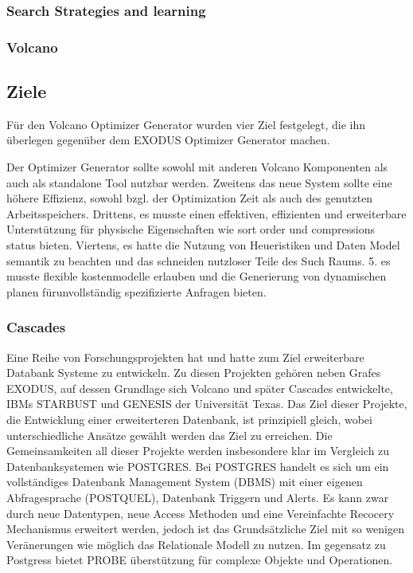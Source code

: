 \subsubsection{Search Strategies and learning}

\subsubsection{Volcano}

\subsection{Ziele}
Für den Volcano Optimizer Generator wurden vier Ziel festgelegt, die ihn überlegen gegenüber dem EXODUS Optimizer Generator machen.

Der Optimizer Generator sollte sowohl mit anderen Volcano Komponenten als auch als standalone Tool nutzbar werden. Zweitens das neue System sollte eine höhere Effizienz, sowohl bzgl. der Optimization Zeit als auch des genutzten Arbeitsspeichers. Drittens, es musste einen effektiven, effizienten und erweiterbare Unterstützung für physische Eigenschaften wie sort order und compressions status bieten. Viertens, es hatte die Nutzung von Heueristiken und Daten Model semantik zu beachten und das schneiden nutzloser Teile des Such Raums. 5. es musste flexible kostenmodelle erlauben und die Generierung von dynamischen planen fürunvollständig spezifizierte Anfragen bieten.



\subsubsection{Cascades}








Eine Reihe von Forschungsprojekten hat und hatte zum Ziel erweiterbare Databank Systeme zu entwickeln. Zu diesen Projekten gehören neben Grafes EXODUS, auf dessen Grundlage sich Volcano und später Cascades entwickelte, IBMs STARBUST und GENESIS der Universität Texas. Das Ziel dieser Projekte, die Entwicklung einer erweiterteren Datenbank, ist prinzipiell gleich, wobei unterschiedliche Ansätze gewählt werden das Ziel zu erreichen. Die Gemeinsamkeiten all dieser Projekte werden insbesondere klar im Vergleich zu Datenbanksystemen wie POSTGRES. Bei POSTGRES handelt es sich um ein vollständiges Datenbank Management System (\ac{DBMS}) mit einer eigenen Abfragesprache (POSTQUEL), Datenbank Triggern und Alerts. Es kann zwar durch neue Datentypen, neue Access Methoden und eine Vereinfachte Recocery Mechanismus erweitert werden, jedoch ist das Grundsätzliche Ziel mit so wenigen Veränerungen wie möglich das Relationale Modell zu nutzen. Im gegensatz zu Postgress bietet PROBE überstützung für complexe Objekte und Operationen. 


